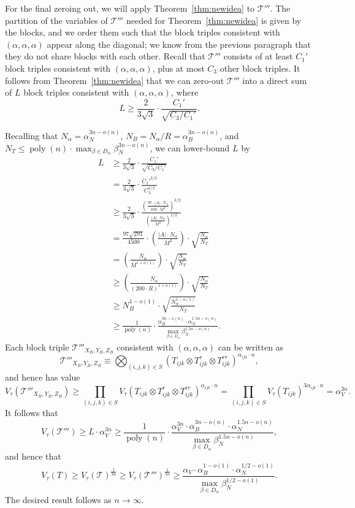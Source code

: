 \PassOptionsToPackage{shortlabels}{enumitem}\documentclass[10pt,a4paper]{article}
\newcommand{\poly}{\mathop{\mathrm{poly}}}
\newcommand{\T}{\mathcal{T}}
\begin{document}
For the final zeroing out, we will apply Theorem~\ref{thm:newidea} to $\T'''$. The partition of the variables of $\T'''$ needed for Theorem~\ref{thm:newidea} is given by the blocks, and we order them such that the block triples consistent with $(\alpha,\alpha,\alpha)$ appear along the diagonal; we know from the previous paragraph that they do not share blocks with each other. Recall that $\T'''$ consists of at least $C_1'$ block triples consistent with $(\alpha,\alpha,\alpha)$, plus at most $C_3$ other block triples. It follows from Theorem~\ref{thm:newidea} that we can zero-out $\T'''$ into a direct sum of $L$ block triples consistent with $(\alpha,\alpha,\alpha)$, where $$L \geq\frac{2}{3 \sqrt{3}} \cdot \frac{C_1'}{\sqrt{C_3/C_1'}}.$$

Recalling that $N_\alpha = \alpha_N^{3n - o(n)}$, $N_B = N_\alpha / R = \alpha_B^{3n - o(n)}$, and $N_T \leq \poly(n) \cdot \max_{\beta \in D_\alpha} \beta_N^{3 n - o(n)}$, we can lower-bound $L$ by
\allowdisplaybreaks \begin{align*}L &\geq\frac{2}{3 \sqrt{3}} \cdot \frac{C_1'}{\sqrt{C_3/C_1'}} 
\\ &= \frac{2}{3 \sqrt{3}} \cdot \frac{C_1'^{3/2}}{C_3^{1/2}}
\\ &\geq \frac{2}{3 \sqrt{3}} \cdot \frac{\left(\frac{97 \cdot |A|\cdot N_\alpha}{100 \cdot M^{2}}\right)^{3/2}}{\left(\frac{|A| \cdot N_T}{M^2}\right)^{1/2}}
\\ &= \frac{97 \sqrt{291}}{4500} \cdot \left(\frac{|A|\cdot N_\alpha}{M^{2}}\right) \cdot \sqrt{\frac{N_\alpha}{N_T}}
\\ &= \left(\frac{N_\alpha}{M^{1+o(1)}}\right) \cdot \sqrt{\frac{N_\alpha}{N_T}}
\\ &\geq  \left(\frac{N_\alpha}{(200\cdot R)^{1+o(1)}}\right) \cdot \sqrt{\frac{N_\alpha}{N_T}}
\\ &\geq  N_B^{1 - o(1)} \cdot \sqrt{\frac{N_\alpha^{1-o(1)}}{N_T}}
\\ &\geq \frac{1}{\poly(n)} \cdot  \frac{\alpha_B^{3n - o(n)} \cdot \alpha_N^{1.5n - o(n)}}{\max_{\beta \in D_\alpha} \beta_N^{1.5 n - o(n)}}.
\end{align*}
Each block triple $\T'''_{X_B, Y_B, Z_B}$ consistent with $(\alpha,\alpha,\alpha)$ can be written as $$\T'''_{X_B, Y_B, Z_B} \equiv \bigotimes_{(i,j,k) \in S} (T_{ijk} \otimes T_{ijk}^r \otimes T_{ijk}^{rr})^{\alpha_{ijk} \cdot n},$$
and hence has value $$V_\tau(\T'''_{X_B, Y_B, Z_B}) \geq \prod_{(i,j,k) \in S} V_\tau(T_{ijk} \otimes T_{ijk}^r \otimes T_{ijk}^{rr})^{\alpha_{ijk} \cdot n} = \prod_{(i,j,k) \in S} V_\tau(T_{ijk})^{3 \alpha_{ijk} \cdot n} = \alpha_V^{3n}.$$
It follows that
$$V_\tau(\T''') \geq L \cdot \alpha_V^{3n} \geq \frac{1}{\poly(n)} \cdot  \frac{\alpha_V^{3n} \cdot \alpha_B^{3n - o(n)} \cdot \alpha_N^{1.5n - o(n)}}{\max_{\beta \in D_\alpha} \beta_N^{1.5 n - o(n)}},$$
and hence that
$$V_\tau(T) \geq V_\tau(\T)^{\frac{1}{3n}} \geq V_\tau(\T''')^{\frac{1}{3n}} \geq \frac{\alpha_V \cdot \alpha_B^{1 - o(1)} \cdot \alpha_N^{1/2 - o(1)}}{\max_{\beta \in D_\alpha} \beta_N^{1/2 - o(1)}}.$$
The desired result follows as $n \to \infty$.
\end{document}
